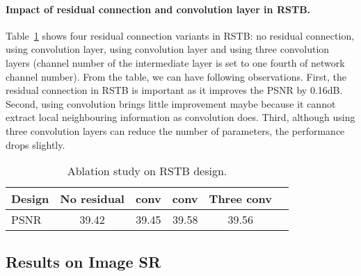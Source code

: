 \documentclass[10pt,twocolumn,letterpaper]{article}
\newlength \g
\begin{document}
 

\vspace{-0.4cm}
\paragraph{Impact of residual connection and convolution layer in RSTB.}
Table~\ref{tab:ablation_RSTB_design} shows four residual connection variants in RSTB: no residual connection, using  convolution layer, using  convolution layer and using three  convolution layers (channel number of the intermediate layer is set to one fourth of network channel number). From the table, we can have following observations. First, the residual connection in RSTB is important as it improves the PSNR by 0.16dB. Second, using  convolution brings little improvement maybe because it cannot extract local neighbouring information as  convolution does. Third, although using three  convolution layers can reduce the number of parameters, the performance drops slightly.


\begin{table}[t]
\captionsetup{font=small}\scriptsize
\center
\begin{center}
\caption{Ablation study on RSTB design.}
\vspace{-2mm}
\label{tab:ablation_RSTB_design}
\begin{tabular}{|l|c|c|c|c|c|}
\hline
Design & No residual &  conv &  conv & Three  conv
\\
\hline
PSNR & 39.42 & 39.45 & 39.58 & 39.56\\
\hline
\end{tabular}
\end{center}
\vspace{-0.3cm}
\end{table}
 
 
 
\subsection{Results on Image SR}
\end{document}
